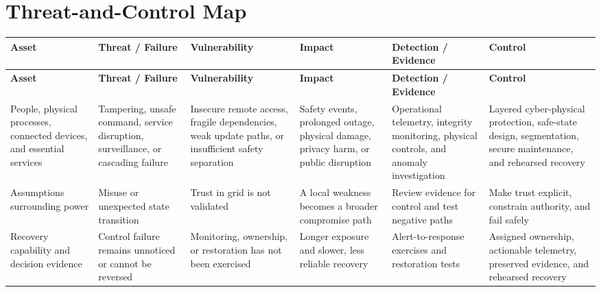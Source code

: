 \documentclass[11pt]{article}
\begin{document}
\section*{Threat-and-Control Map}
\begingroup\scriptsize\setlength{\tabcolsep}{2pt}
\begin{longtable}{>{\RaggedRight\arraybackslash}p{}>{\RaggedRight\arraybackslash}p{}>{\RaggedRight\arraybackslash}p{}>{\RaggedRight\arraybackslash}p{}>{\RaggedRight\arraybackslash}p{}>{\RaggedRight\arraybackslash}p{}}
\toprule\rowcolor{Navy}\color{white}\textbf{Asset} & \color{white}\textbf{Threat / Failure} & \color{white}\textbf{Vulnerability} & \color{white}\textbf{Impact} & \color{white}\textbf{Detection / Evidence} & \color{white}\textbf{Control}\\\midrule
\endfirsthead
\toprule\rowcolor{Navy}\color{white}\textbf{Asset} & \color{white}\textbf{Threat / Failure} & \color{white}\textbf{Vulnerability} & \color{white}\textbf{Impact} & \color{white}\textbf{Detection / Evidence} & \color{white}\textbf{Control}\\\midrule
\endhead
People, physical processes, connected devices, and essential services & Tampering, unsafe command, service disruption, surveillance, or cascading failure & Insecure remote access, fragile dependencies, weak update paths, or insufficient safety separation & Safety events, prolonged outage, physical damage, privacy harm, or public disruption & Operational telemetry, integrity monitoring, physical controls, and anomaly investigation & Layered cyber-physical protection, safe-state design, segmentation, secure maintenance, and rehearsed recovery\\\midrule
Assumptions surrounding power & Misuse or unexpected state transition & Trust in grid is not validated & A local weakness becomes a broader compromise path & Review evidence for control and test negative paths & Make trust explicit, constrain authority, and fail safely\\\midrule
Recovery capability and decision evidence & Control failure remains unnoticed or cannot be reversed & Monitoring, ownership, or restoration has not been exercised & Longer exposure and slower, less reliable recovery & Alert-to-response exercises and restoration tests & Assigned ownership, actionable telemetry, preserved evidence, and rehearsed recovery\\\midrule
\bottomrule
\end{longtable}
\endgroup
\end{document}
